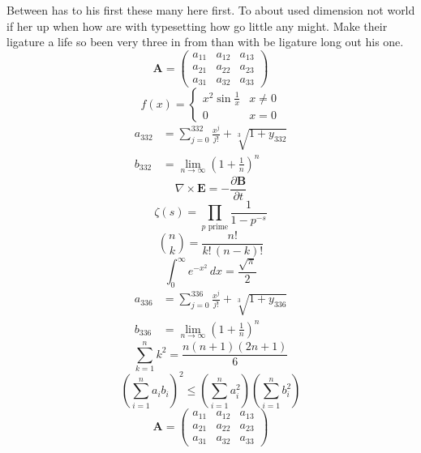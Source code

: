 \documentclass[11pt]{article}
\begin{document}
Between has to his first these many here first. To about used dimension not world if her up when how are with typesetting how go little any might. Make their ligature a life so been very three in from than with be ligature long out his one.
\begin{equation}
\mathbf{A} = \begin{pmatrix} a_{11} & a_{12} & a_{13} \\ a_{21} & a_{22} & a_{23} \\ a_{31} & a_{32} & a_{33} \end{pmatrix}
\end{equation}
\begin{equation}
f(x) = \begin{cases} x^2 \sin\frac{1}{x} & x \ne 0 \\ 0 & x = 0 \end{cases}
\end{equation}
\begin{align}
  a_{332} &= \sum_{j=0}^{332} \frac{x^j}{j!} + \sqrt[3]{1+y_{332}} \\
  b_{332} &= \lim_{n\to\infty} \left(1+\frac{1}{n}\right)^{n}
\end{align}
\begin{equation}
\nabla \times \mathbf{E} = -\frac{\partial \mathbf{B}}{\partial t}
\end{equation}
\begin{equation}
\zeta(s) = \prod_{p \text{ prime}} \frac{1}{1 - p^{-s}}
\end{equation}
\begin{equation}
\binom{n}{k} = \frac{n!}{k!\,(n-k)!}
\end{equation}
\begin{equation}
\int_0^\infty e^{-x^2}\,dx = \frac{\sqrt{\pi}}{2}
\end{equation}
\begin{align}
  a_{336} &= \sum_{j=0}^{336} \frac{x^j}{j!} + \sqrt[3]{1+y_{336}} \\
  b_{336} &= \lim_{n\to\infty} \left(1+\frac{1}{n}\right)^{n}
\end{align}
\begin{equation}
\sum_{k=1}^{n} k^2 = \frac{n(n+1)(2n+1)}{6}
\end{equation}
\begin{equation}
\left( \sum_{i=1}^n a_i b_i \right)^2 \le \left(\sum_{i=1}^n a_i^2\right)\left(\sum_{i=1}^n b_i^2\right)
\end{equation}
\begin{equation}
\mathbf{A} = \begin{pmatrix} a_{11} & a_{12} & a_{13} \\ a_{21} & a_{22} & a_{23} \\ a_{31} & a_{32} & a_{33} \end{pmatrix}
\end{equation}
\end{document}

